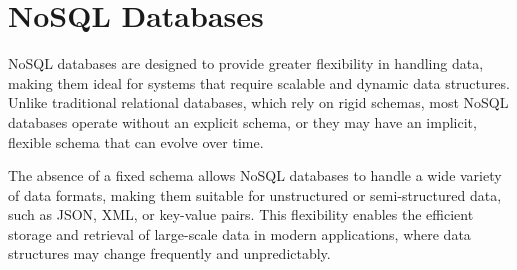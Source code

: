 \section{NoSQL Databases}

NoSQL databases are designed to provide greater flexibility in handling data, making them ideal for systems that require scalable and dynamic data structures. 
Unlike traditional relational databases, which rely on rigid schemas, most NoSQL databases operate without an explicit schema, or they may have an implicit, flexible schema that can evolve over time.

The absence of a fixed schema allows NoSQL databases to handle a wide variety of data formats, making them suitable for unstructured or semi-structured data, such as JSON, XML, or key-value pairs. 
This flexibility enables the efficient storage and retrieval of large-scale data in modern applications, where data structures may change frequently and unpredictably.